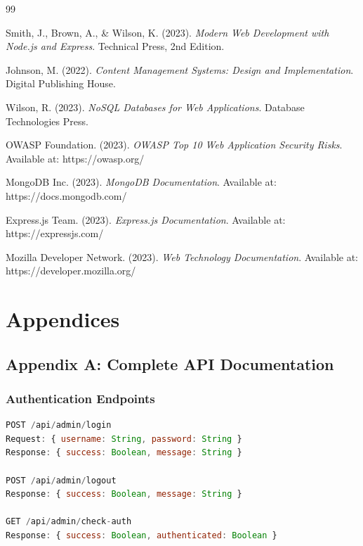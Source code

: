 \documentclass[12pt,a4paper]{report}
\begin{document}
\begin{thebibliography}{99}

Smith, J., Brown, A., \& Wilson, K. (2023).
\textit{Modern Web Development with Node.js and Express}.
Technical Press, 2nd Edition.

Johnson, M. (2022).
\textit{Content Management Systems: Design and Implementation}.
Digital Publishing House.

Wilson, R. (2023).
\textit{NoSQL Databases for Web Applications}.
Database Technologies Press.

OWASP Foundation. (2023).
\textit{OWASP Top 10 Web Application Security Risks}.
Available at: https://owasp.org/

MongoDB Inc. (2023).
\textit{MongoDB Documentation}.
Available at: https://docs.mongodb.com/

Express.js Team. (2023).
\textit{Express.js Documentation}.
Available at: https://expressjs.com/

Mozilla Developer Network. (2023).
\textit{Web Technology Documentation}.
Available at: https://developer.mozilla.org/

\end{thebibliography}

\chapter{Appendices}
\label{chap:appendices}

\section{Appendix A: Complete API Documentation}
\subsection{Authentication Endpoints}
\begin{lstlisting}[language=JavaScript, caption=Admin Authentication API]
POST /api/admin/login
Request: { username: String, password: String }
Response: { success: Boolean, message: String }

POST /api/admin/logout
Response: { success: Boolean, message: String }

GET /api/admin/check-auth
Response: { success: Boolean, authenticated: Boolean }
\end{lstlisting}
\end{document}
